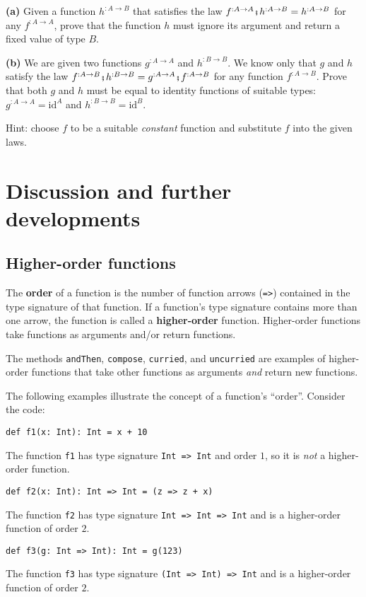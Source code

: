 \textbf{(a)} Given a function $h^{:A\rightarrow B}$ that satisfies
the law $f^{:A\rightarrow A}\bef h^{:A\rightarrow B}=h^{:A\rightarrow B}$
for any $f^{:A\rightarrow A}$, prove that the function $h$ must
ignore its argument and return a fixed value of type $B$.

\textbf{(b)} We are given two functions $g^{:A\rightarrow A}$ and
$h^{:B\rightarrow B}$. We know only that $g$ and $h$ satisfy the
law $f^{:A\rightarrow B}\bef h^{:B\rightarrow B}=g^{:A\rightarrow A}\bef f^{:A\rightarrow B}$
for any function $f^{:A\rightarrow B}$. Prove that both $g$ and
$h$ must be equal to identity functions of suitable types: $g^{:A\rightarrow A}=\text{id}^{A}$
and $h^{:B\rightarrow B}=\text{id}^{B}$.

Hint: choose $f$ to be a suitable \emph{constant} function and substitute
$f$ into the given laws.

\section{Discussion and further developments}

\subsection{Higher-order functions}

The \textbf{order} of a function is the
number of function arrows (\lstinline!=>!) contained in the type
signature of that function. If a function\textsf{'}s type signature contains
more than one arrow, the function is called a \textbf{higher-order}
function. Higher-order functions take functions as arguments and/or
return functions.

The methods \lstinline!andThen!, \lstinline!compose!, \lstinline!curried!,
and \lstinline!uncurried! are examples of higher-order functions
that take other functions as arguments \emph{and} return new functions.

The following examples illustrate the concept of a function\textsf{'}s \textsf{``}order\textsf{''}.
Consider the code:
\begin{lstlisting}
def f1(x: Int): Int = x + 10
\end{lstlisting}
The function \texttt{}\lstinline!f1! has type signature \texttt{}\lstinline!Int => Int!
and order $1$, so it is \emph{not} a higher-order function.
\begin{lstlisting}
def f2(x: Int): Int => Int = (z => z + x)
\end{lstlisting}
The function \texttt{}\lstinline!f2! has type signature \texttt{}\lstinline!Int => Int => Int!
and is a higher-order function of order $2$. 
\begin{lstlisting}
def f3(g: Int => Int): Int = g(123)
\end{lstlisting}
The function \texttt{}\lstinline!f3! has type signature \texttt{}\lstinline!(Int => Int) => Int!
and is a higher-order function of order $2$.

